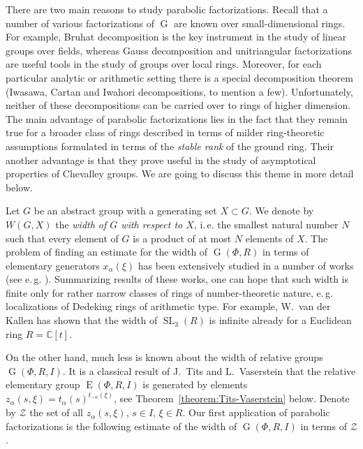 \documentclass[12pt]{amsart}
\numberwithin{equation}{section}
\theoremstyle{definition}
\DeclareMathOperator{\G}{G}
\DeclareMathOperator{\SL}{SL}
\DeclareMathOperator{\E}{E}
\begin{document}
There are two main reasons to study parabolic factorizations.
Recall that a number of various factorizations of $\G$ are known over small-dimensional rings.
For example, Bruhat decomposition is the key instrument in the study of linear groups over fields, whereas Gauss decomposition and unitriangular factorizations are useful tools in the study of groups over local rings.
Moreover, for each particular analytic or arithmetic setting there is a special decomposition theorem (Iwasawa, Cartan and Iwahori decompositions, to mention a few).
Unfortunately, neither of these decompositions can be carried over to rings of higher dimension.
The main advantage of parabolic factorizations lies in the fact that they remain true for a broader class of rings described in terms of milder ring-theoretic assumptions formulated in terms of the \emph{stable rank} of the ground ring.
Their another advantage is that they prove useful in the study of asymptotical properties of Chevalley groups. We are going to discuss this theme in more detail below.

Let $G$ be an abstract group with a generating set $X \subset G$. 
We denote by $W(G, X)$ the \emph{width of $G$ with respect to $X$}, i.\,e. the smallest natural number $N$ such that every element of $G$ is a product of at most $N$ elements of $X$.
The problem of finding an estimate for the width of $\G(\Phi, R)$ in terms of elementary generators $x_\alpha(\xi)$ has been extensively studied in a number of works (see e.\,g. \cite{CK83, Ka82, Tavgen91, Mo07, VseUnitrZ1p, VavSmSuUnitrEng}).
Summarizing results of these works, one can hope that such width is finite only for rather narrow classes of rings of number-theoretic nature, e.\,g. localizations of Dedeking rings of arithmetic type.
For example, W.~van der Kallen has shown that the width of $\SL_3(R)$ is infinite already for a Euclidean ring $R=\mathbb{C}[t]$.

On the other hand, much less is known about the width of relative groups $\G(\Phi, R, I)$. 
It is a classical result of J.~Tits and L.~Vaserstein that the relative elementary group $\E(\Phi, R, I)$ is generated by elements $z_\alpha(s,\xi)=t_{\alpha}(s)^{t_{-\alpha}(\xi)}$, see Theorem~\ref{theorem:Tits-Vaserstein} below.
Denote by $\mathcal{Z}$ the set of all $z_\alpha(s, \xi)$, $s\in I$, $\xi \in R$. 
Our first application of parabolic factorizations is the following estimate of the width of $\G(\Phi, R, I)$ in terms of $\mathcal{Z}$.
\end{document}
